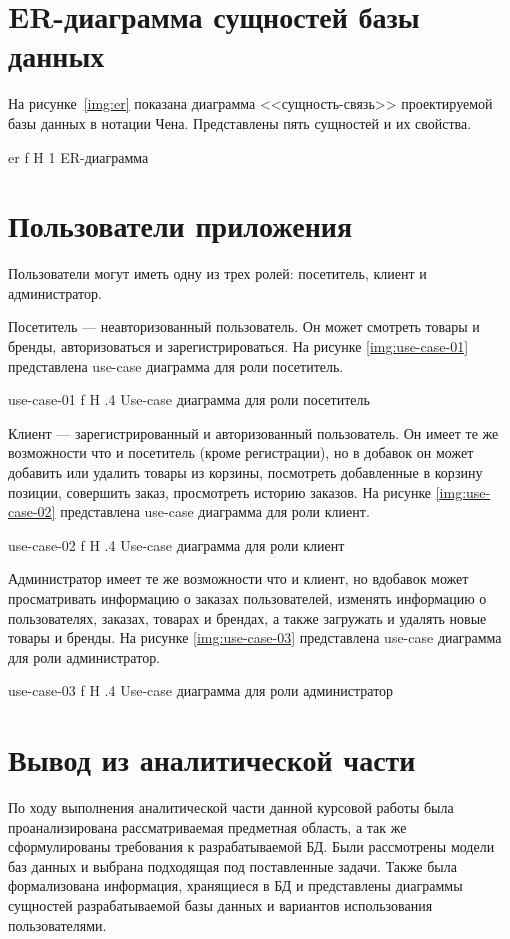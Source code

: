 \documentclass{bmstu}
\begin{document}
\section{ER-диаграмма сущностей базы данных}

На рисунке~\ref{img:er} показана диаграмма <<сущность-связь>> проектируемой базы данных в нотации Чена. 
Представлены пять сущностей и их свойства.

    {er}
    {f}
    {H}
    {1\textwidth}
    {ER-диаграмма}
    
\section{Пользователи приложения}

Пользователи могут иметь одну из трех ролей: посетитель, клиент и администратор.

Посетитель --- неавторизованный пользователь. 
Он может смотреть товары и бренды, авторизоваться и зарегистрироваться. На рисунке \ref{img:use-case-01} представлена use-case диаграмма для роли посетитель.

{use-case-01}
{f}
{H}
{.4\textwidth}
{Use-case диаграмма для роли посетитель}

Клиент --- зарегистрированный и авторизованный пользователь. 
Он имеет те же возможности что и посетитель (кроме регистрации), но в добавок он может добавить или удалить товары из корзины, посмотреть добавленные в корзину позиции, совершить заказ, просмотреть историю заказов. На рисунке \ref{img:use-case-02} представлена use-case диаграмма для роли клиент.

{use-case-02}
{f}
{H}
{.4\textwidth}
{Use-case диаграмма для роли клиент}

Администратор имеет те же возможности что и клиент, но вдобавок может просматривать информацию о заказах пользователей, изменять информацию о пользователях, заказах, товарах и брендах, а также загружать и удалять новые товары и бренды. На рисунке \ref{img:use-case-03} представлена use-case диаграмма для роли администратор.

{use-case-03}
{f}
{H}
{.4\textwidth}
{Use-case диаграмма для роли администратор}

\section*{Вывод из аналитической части}

По ходу выполнения аналитической части данной курсовой работы была проанализирована рассматриваемая предметная область, а так же сформулированы требования к разрабатываемой БД. Были рассмотрены модели баз данных и выбрана подходящая под поставленные задачи. Также была формализована информация, хранящиеся в БД и представлены диаграммы сущностей разрабатываемой базы данных и вариантов использования пользователями.
\end{document}
